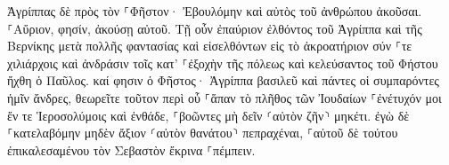 \documentclass{openreader}
\begin{document}
Ἀγρίππας δὲ πρὸς τὸν ⸀Φῆστον· Ἐβουλόμην καὶ αὐτὸς τοῦ ἀνθρώπου ἀκοῦσαι. ⸀Αὔριον, φησίν, ἀκούσῃ αὐτοῦ. 
Τῇ οὖν ἐπαύριον ἐλθόντος τοῦ Ἀγρίππα καὶ τῆς Βερνίκης μετὰ πολλῆς φαντασίας καὶ εἰσελθόντων εἰς τὸ ἀκροατήριον σύν ⸀τε χιλιάρχοις καὶ ἀνδράσιν τοῖς κατ’ ⸀ἐξοχὴν τῆς πόλεως καὶ κελεύσαντος τοῦ Φήστου ἤχθη ὁ Παῦλος. 
καί φησιν ὁ Φῆστος· Ἀγρίππα βασιλεῦ καὶ πάντες οἱ συμπαρόντες ἡμῖν ἄνδρες, θεωρεῖτε τοῦτον περὶ οὗ ⸀ἅπαν τὸ πλῆθος τῶν Ἰουδαίων ⸀ἐνέτυχόν μοι ἔν τε Ἱεροσολύμοις καὶ ἐνθάδε, ⸀βοῶντες μὴ δεῖν ⸂αὐτὸν ζῆν⸃ μηκέτι. 
ἐγὼ δὲ ⸀κατελαβόμην μηδὲν ἄξιον ⸂αὐτὸν θανάτου⸃ πεπραχέναι, ⸀αὐτοῦ δὲ τούτου ἐπικαλεσαμένου τὸν Σεβαστὸν ἔκρινα ⸀πέμπειν. 
\end{document}
